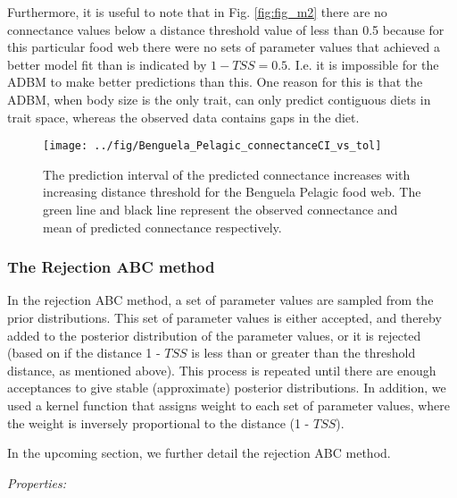 \documentclass{article}
\begin{document}
Furthermore, it is useful to note that in Fig. \ref{fig:fig_m2} there
are no connectance values below a distance threshold value of less than
0.5 because for this particular food web there were no sets of parameter
values that achieved a better model fit than is indicated by
\(1-TSS = 0.5\). I.e. it is impossible for the ADBM to make better
predictions than this. One reason for this is that the ADBM, when body
size is the only trait, can only predict contiguous diets in trait
space, whereas the observed data contains gaps in the diet.

\begin{figure}[h]

{\centering \texttt{[image: ../fig/Benguela\_Pelagic\_connectanceCI\_vs\_tol]} 

}

\caption{\label{fig:fig_m2}The prediction interval of the predicted connectance increases with increasing distance threshold for the Benguela Pelagic food web. The green line and black line represent the observed connectance and mean of predicted connectance respectively.}\label{fig:unnamed-chunk-4}
\end{figure}

\hypertarget{the-rejection-abc-method}{%
\subsubsection{The Rejection ABC
method}\label{the-rejection-abc-method}}

In the rejection ABC method, a set of parameter values are sampled from
the prior distributions. This set of parameter values is either
accepted, and thereby added to the posterior distribution of the
parameter values, or it is rejected (based on if the distance 1 -
\(TSS\) is less than or greater than the threshold distance, as
mentioned above). This process is repeated until there are enough
acceptances to give stable (approximate) posterior distributions. In
addition, we used a kernel function that assigns weight to each set of
parameter values, where the weight is inversely proportional to the
distance (1 - \(TSS\)).

In the upcoming section, we further detail the rejection ABC method.

\emph{Properties:}
\end{document}
